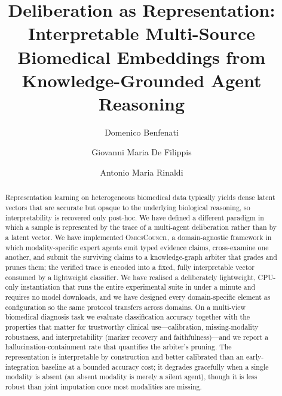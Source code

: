 \documentclass[runningheads]{llncs}
\begin{document}
\title{Deliberation as Representation: Interpretable Multi-Source Biomedical Embeddings from Knowledge-Grounded Agent Reasoning}

\author{Domenico Benfenati \and Giovanni Maria De Filippis \and Antonio Maria Rinaldi}


\maketitle

\begin{abstract}
Representation learning on heterogeneous biomedical data typically yields dense latent vectors that are accurate but opaque to the underlying biological reasoning, so interpretability is recovered only post-hoc. We have defined a different paradigm in which a sample is represented by the trace of a multi-agent deliberation rather than by a latent vector. We have implemented \textsc{OmicsCouncil}, a domain-agnostic framework in which modality-specific expert agents emit typed evidence claims, cross-examine one another, and submit the surviving claims to a knowledge-graph arbiter that grades and prunes them; the verified trace is encoded into a fixed, fully interpretable vector consumed by a lightweight classifier. We have realised a deliberately lightweight, CPU-only instantiation that runs the entire experimental suite in under a minute and requires no model downloads, and we have designed every domain-specific element as configuration so the same protocol transfers across domains. On a multi-view biomedical diagnosis task we evaluate classification accuracy together with the properties that matter for trustworthy clinical use---calibration, missing-modality robustness, and interpretability (marker recovery and faithfulness)---and we report a hallucination-containment rate that quantifies the arbiter's pruning. The representation is interpretable by construction and better calibrated than an early-integration baseline at a bounded accuracy cost; it degrades gracefully when a single modality is absent (an absent modality is merely a silent agent), though it is less robust than joint imputation once most modalities are missing. 
\end{abstract}
\end{document}

